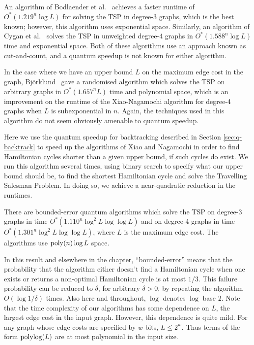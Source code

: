 An algorithm of Bodlaender et al.~\cite{bodlaender15} achieves a faster runtime of $O^*(1.219^n\log L)$ for solving the TSP in degree-3 graphs, which is the best known; however, this algorithm uses exponential space. Similarly, an algorithm of Cygan et al.~\cite{cygan11} solves the TSP in unweighted degree-4 graphs in $O^*(1.588^n\log L)$ time and exponential space. Both of these algorithms use an approach known as cut-and-count, and a quantum speedup is not known for either algorithm.

In the case where we have an upper bound $L$ on the maximum edge cost in the graph, Bj\"orklund~\cite{bjorklund14} gave a randomised algorithm which solves the TSP on arbitrary graphs in $O^*(1.657^n L)$ time and polynomial space, which is an improvement on the runtime of the Xiao-Nagamochi algorithm for degree-4 graphs when $L$ is subexponential in $n$. Again, the techniques used in this algorithm do not seem obviously amenable to quantum speedup.

Here we use the quantum speedup for backtracking described in Section \ref{sec:q-backtrack} to speed up the algorithms of Xiao and Nagamochi in order to find Hamiltonian cycles shorter than a given upper bound, if such cycles do exist. We run this algorithm several times, using binary search to specify what our upper bound should be, to find the shortest Hamiltonian cycle and solve the Travelling Salesman Problem. In doing so, we achieve a near-quadratic reduction in the runtimes.

\begin{theorem}
There are bounded-error quantum algorithms which solve the TSP on degree-3 graphs in time $O^*(1.110^n \log^2 L \log \log L)$ and on degree-4 graphs in time $O^*(1.301^n \log^2 L \log \log L)$, where $L$ is the maximum edge cost. The algorithms use $\operatorname{poly}(n)\log L$ space.
\label{thm:deg34}
\end{theorem}

In this result and elsewhere in the chapter, ``bounded-error'' means that the probability that the algorithm either doesn't find a Hamiltonian cycle when one exists or returns a non-optimal Hamiltonian cycle is at most $1/3$. This failure probability can be reduced to $\delta$, for arbitrary $\delta > 0$, by repeating the algorithm $O(\log 1/\delta)$ times. Also here and throughout, $\log$ denotes $\log$ base 2. Note that the time complexity of our algorithms has some dependence on $L$, the largest edge cost in the input graph. However, this dependence is quite mild. For any graph whose edge costs are specified by $w$ bits, $L \le 2^w$. Thus terms of the form $\operatorname{polylog}(L)$ are at most polynomial in the input size.

